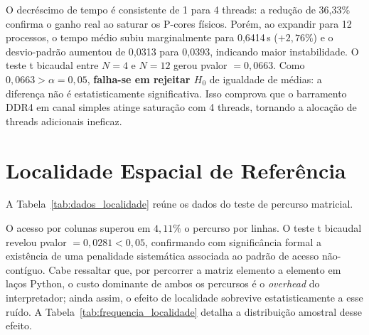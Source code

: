 \documentclass[
	12pt,
	openright,
	oneside,
	a4paper,
	english,
	brazil
	]{abntex2}
\begin{document}
O decréscimo de tempo é consistente de 1 para 4 threads: a redução de 36,33\% confirma o ganho real ao saturar os P-cores físicos. Porém, ao expandir para 12 processos, o tempo médio subiu marginalmente para 0,6414\,s ($+2{,}76\%$) e o desvio-padrão aumentou de 0,0313 para 0,0393, indicando maior instabilidade. O teste t bicaudal entre $N=4$ e $N=12$ gerou p\text{-}valor $= 0{,}0663$. Como $0{,}0663 > \alpha = 0{,}05$, \textbf{falha-se em rejeitar $H_0$} de igualdade de médias: a diferença não é estatisticamente significativa. Isso comprova que o barramento DDR4 em canal simples atinge saturação com 4 threads, tornando a alocação de threads adicionais ineficaz.

\section{Localidade Espacial de Referência}
\label{sec:resultados_localidade}

A Tabela~\ref{tab:dados_localidade} reúne os dados do teste de percurso matricial.

\begin{table}[htb]
\centering
\caption{Tempos de acesso no teste de localidade de cache ($N = 30$)}
\label{tab:dados_localidade}
\small
{}
\end{table}

O acesso por colunas superou em $4{,}11\%$ o percurso por linhas. O teste t bicaudal revelou p\text{-}valor $= 0{,}0281 < 0{,}05$, confirmando com significância formal a existência de uma penalidade sistemática associada ao padrão de acesso não-contíguo. Cabe ressaltar que, por percorrer a matriz elemento a elemento em laços Python, o custo dominante de ambos os percursos é o \textit{overhead} do interpretador; ainda assim, o efeito de localidade sobrevive estatisticamente a esse ruído. A Tabela~\ref{tab:frequencia_localidade} detalha a distribuição amostral desse efeito.
\end{document}
